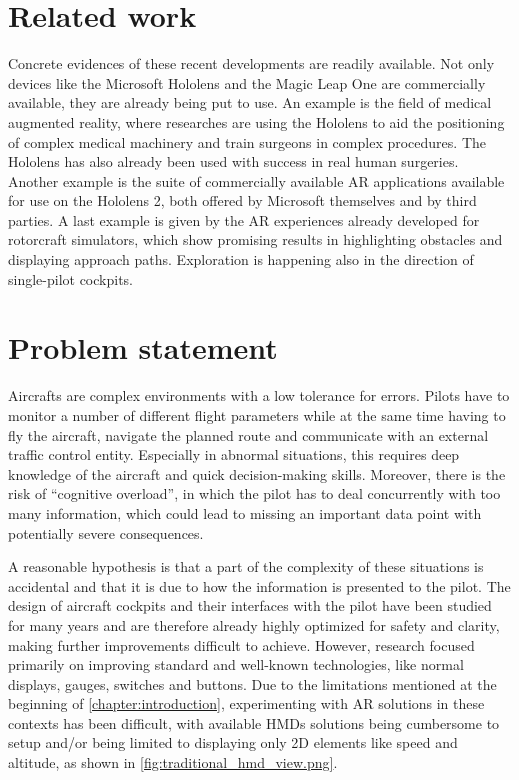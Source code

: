 \section{Related work}\label{section:relatedwork}

Concrete evidences of these recent developments are readily available. Not only devices like the Microsoft Hololens\cite{microsoft_corporation_microsoft_nodate} and the Magic Leap One\cite{magic_leap_inc_magic_nodate} are commercially available, they are already being put to use. An example is the field of medical augmented reality, where researches are using the Hololens to aid the positioning of complex medical machinery\cite{andress_--fly_2018, fotouhi_interventional_2016, fallavollita_desired-view--controlled_2014} and train surgeons in complex procedures\cite{turini_microsoft_2018}. The Hololens has also already been used with success in real human surgeries\cite{assistance_publique_hopitaux_de_paris_world_nodate}. Another example is the suite of commercially available \gls{AR} applications available for use on the Hololens 2, both offered by Microsoft themselves\cite{microsoft_corporation_remote_nodate} and by third parties\cite{microsoft_corporation_apps_nodate}. A last example is given by the \gls{AR} experiences already developed for rotorcraft simulators, which show promising results in highlighting obstacles and displaying approach paths\cite{walko_increasing_2021}. Exploration is happening also in the direction of single-pilot cockpits\cite{tran_single_2018}.

\section{Problem statement}\label{section:problemstatement}
Aircrafts are complex environments with a low tolerance for errors. Pilots have to monitor a number of different flight parameters while at the same time having to fly the aircraft, navigate the planned route and communicate with an external traffic control entity. Especially in abnormal situations, this requires deep knowledge of the aircraft and quick decision-making skills. Moreover, there is the risk of \enquote{cognitive overload}, in which the pilot has to deal concurrently with too many information, which could lead to missing an important data point with potentially severe consequences.

A reasonable hypothesis is that a part of the complexity of these situations is accidental\cite{brooks_no_1987} and that it is due to how the information is presented to the pilot. The design of aircraft cockpits and their interfaces with the pilot have been studied for many years and are therefore already highly optimized for safety and clarity, making further improvements difficult to achieve. However, research focused primarily on improving standard and well-known technologies, like normal displays, gauges, switches and buttons. Due to the limitations mentioned at the beginning of \autoref{chapter:introduction}, experimenting with \gls{AR} solutions in these contexts has been difficult, with available \glspl{HMD} solutions being cumbersome to setup and/or being limited to displaying only 2D elements like speed and altitude, as shown in \autoref{fig:traditional_hmd_view.png}.

